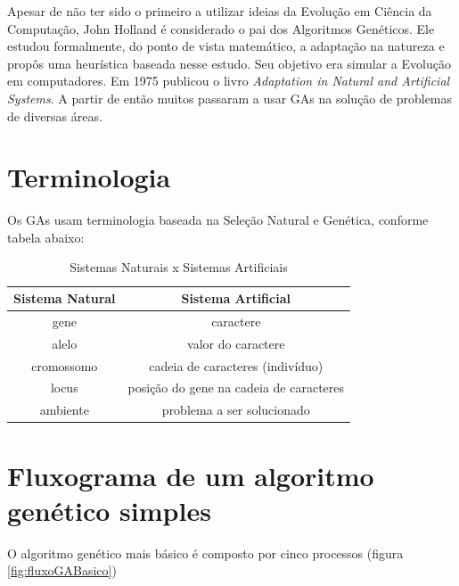 Apesar de não ter sido o primeiro a utilizar ideias da Evolução em Ciência da Computação, John Holland é considerado o pai dos Algoritmos Genéticos. Ele estudou formalmente, do ponto de vista matemático, a adaptação na natureza e propôs uma heurística baseada nesse estudo. Seu objetivo era simular a Evolução em computadores. Em 1975 publicou o livro \emph{Adaptation in Natural and Artificial Systems}. A partir de então muitos passaram a usar GAs na solução de problemas de diversas áreas.

\section{Terminologia}

Os GAs usam terminologia baseada na Seleção Natural e Genética, conforme tabela abaixo:
 
\begin{table}[htp]
	\caption{\label{tabSist}Sistemas Naturais x Sistemas Artificiais}
	\begin{center}
		\begin{tabular}{c|c}
			\hline
			\textbf{Sistema Natural}  & \textbf{Sistema Artificial} \\
			\hline
			gene				&			caractere																		\\
			alelo				&			valor do caractere													\\
			cromossomo	&			cadeia de caracteres (indivíduo)						\\ 
			locus				&			posição do gene na cadeia de caracteres			\\
			ambiente		&			problema a ser solucionado									\\
			\hline
		\end{tabular}
	\end{center}
\end{table}

\section{Fluxograma de um algoritmo genético simples}

O algoritmo genético mais básico é composto por cinco processos (figura \ref{fig:fluxoGABasico})

